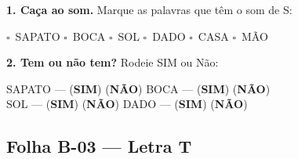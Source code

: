 \begin{somletra}[title={\faMusic~Atividade de Som da Letra --- B\^onus (n\~ao vale nota)}]
\textbf{1. Ca\c{c}a ao som.} Marque as palavras que t\^e{}m o som de S:
\begin{center}
$\square$~SAPATO \quad $\square$~BOCA \quad $\square$~SOL \quad $\square$~DADO \quad $\square$~CASA \quad $\square$~M\~AO
\end{center}

\textbf{2. Tem ou n\~ao{} tem?} Rodeie SIM ou N\~ao:
\begin{center}
SAPATO --- (\textbf{SIM}) (\textbf{N\~AO}) \quad BOCA --- (\textbf{SIM}) (\textbf{N\~AO}) \\ SOL --- (\textbf{SIM}) (\textbf{N\~AO}) \quad DADO --- (\textbf{SIM}) (\textbf{N\~AO})
\end{center}
\end{somletra}



\subsection{Folha B-03 --- Letra T}

